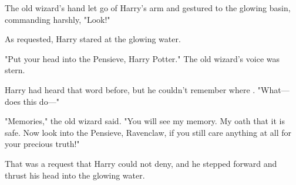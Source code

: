 The old wizard's hand let go of Harry's arm and gestured to the glowing basin, 
commanding harshly, "Look!"

As requested, Harry stared at the glowing water.

"Put your head into the Pensieve, Harry Potter." The old wizard's voice was 
stern.

Harry had heard that word before, but he couldn't remember where . "What---does 
this do---"

"Memories," the old wizard said. "You will see my memory. My oath that it is 
safe. Now look into the Pensieve, Ravenclaw, if you still care anything at all 
for your precious truth!"

That was a request that Harry could not deny, and he stepped forward and thrust 
his head into the glowing water.
\sbreak

